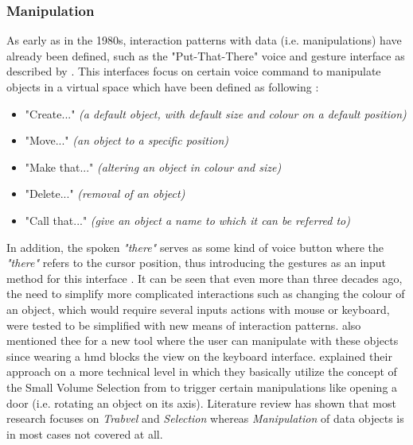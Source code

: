 
\subsubsection{Manipulation}

As early as in the 1980s, interaction patterns with data (i.e. manipulations) have already been defined, such as the "Put-That-There" voice and gesture interface as described by \cite{Bolt1980}. This interfaces focus on certain voice command to manipulate objects in a virtual space which have been defined as following \citep{Bolt1980}:
\begin{itemize}[noitemsep,nolistsep]
	\item "Create..." \textit{(a default object, with default size and colour on a default position)}
	\item "Move..." \textit{(an object to a specific position)}
	\item "Make that..." \textit{(altering an object in colour and size)}
	\item "Delete..." \textit{(removal of an object)}
	\item "Call that..." \textit{(give an object a name to which it can be referred to)}
\end{itemize}
In addition, the spoken \textit{"there"} serves as some kind of voice button where the \textit{"there"} refers to the cursor position, thus introducing the gestures as an input method for this interface \citep{Bolt1980}.
It can be seen that even more than three decades ago, the need to simplify more complicated interactions such as changing the colour of an object, which would require several inputs actions with mouse or keyboard, were tested to be simplified with new means of interaction patterns. \cite{Donalek2014} also mentioned thee for a new tool where the user can manipulate with these objects since wearing a \gls{hmd} blocks the view on the keyboard interface. \newline
\cite{Woodard2015} explained their approach on a more technical level in which they basically utilize the concept of the Small Volume Selection from \cite{Steed2006} to trigger certain manipulations like opening a door (i.e. rotating an object on its axis). \newline
Literature review has shown that most research focuses on \textit{Trabvel} and \textit{Selection} whereas \textit{Manipulation} of data objects is in most cases not covered at all.


